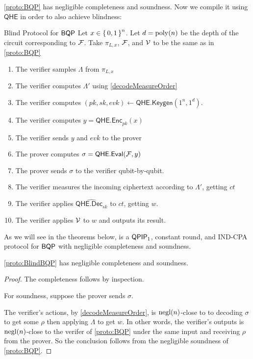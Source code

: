 \cref{proto:BQP} has negligible completeness and soundness.
Now we compile it using $\mathsf{QHE}$ in order to also achieve blindness:

\begin{protocol}{Blind Protocol for $\operatorname{\mathsf{BQP}}$}
	\label{proto:BlindBQP}
	Let $x\in\set{0,1}^n$.
	Let $d=\operatorname*{\operatorname{poly}}(n)$ be the depth of the circuit corresponding to $\mathcal{F}$.
	Take $\pi_{L, x}$, $\mathcal{F}$, and $\mathcal{V}$ to be the same as in \cref{proto:BQP}
	\begin{enumerate}
		\item The verifier samples $\Lambda$ from $\pi_{L, x}$
		\item The verifier computes $\Lambda'$ using \cref{decodeMeasureOrder}
		\item The verifier computes $(pk, sk, evk)\leftarrow\mathsf{QHE.Keygen}(1^n, 1^d)$.
		\item The verifier computes $y=\mathsf{QHE.Enc}_{pk}(x)$
		\item The verifier sends $y$ and $evk$ to the prover
		\item The prover computes $\sigma=\mathsf{QHE.Eval}(\mathcal{F}, y)$
		\item The prover sends $\sigma$ to the verifier qubit-by-qubit.
		\item The verifier measures the incoming ciphertext according to $\Lambda'$, getting $ct$
		\item The verifier applies $\widehat{\mathsf{QHE.Dec}_{sk}}$ to $ct$, getting $w$.
		\item The verifier applies $\mathcal{V}$ to $w$ and outputs its result.
	\end{enumerate}
\end{protocol}

As we will see in the theorems below,  is a $\operatorname{\mathsf{QPIP}}_1$, constant round, and IND-CPA protocol for $\operatorname{\mathsf{BQP}}$ with negligible completeness and soundness.


\begin{thm}
	\cref{proto:BlindBQP} has negligible completeness and soundness.
\end{thm}
\begin{proof}
	The completeness follows by inspection.

	For soundness, suppose the prover sends $\sigma$.

    
	The verifier's actions, by \cref{decodeMeasureOrder}, is $\operatorname{negl}(n)$-close to to decoding $\sigma$ to get some $\rho$ then applying $\Lambda$ to get $w$.
	In other words, the verifier's outputs is $\operatorname{negl}(n)$-close to the verifer of \cref{proto:BQP} under the same input and receiving $\rho$ from the prover.
	So the conclusion follows from the negligible soundness of \cref{proto:BQP}.
\end{proof}

